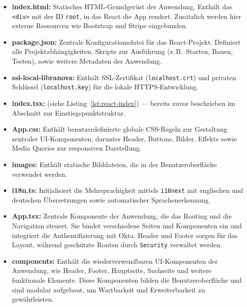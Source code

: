 \begin{itemize}
	\item \textbf{index.html:} Statisches HTML-Grundgerüst der Anwendung. Enthält das \texttt{<div>} mit der ID \texttt{root}, in das React die App rendert. Zusätzlich werden hier externe Ressourcen wie Bootstrap und Stripe eingebunden.
	
	\item \textbf{package.json:} Zentrale Konfigurationsdatei für das React-Projekt. Definiert alle Projektabhängigkeiten, Skripte zur Ausführung (z.\,B.\ Starten, Bauen, Testen), sowie weitere Metadaten der Anwendung.
	
	\item \textbf{ssl-local-libranova:} Enthält SSL-Zertifikat (\texttt{localhost.crt}) und privaten Schlüssel (\texttt{localhost.key}) für die lokale HTTPS-Entwicklung.
	
	\item \textbf{index.tsx:} (siehe Listing~\ref{lst:react-index}) — bereits zuvor beschrieben im Abschnitt zur Einstiegspunktstruktur.
	
	\item \textbf{App.css:} Enthält benutzerdefinierte globale CSS-Regeln zur Gestaltung zentraler UI-Komponenten, darunter Header, Buttons, Bilder, Effekte sowie Media Queries zur responsiven Darstellung.
	
	\item \textbf{images:} Enthält statische Bilddateien, die in der Benutzeroberfläche verwendet werden.
	
	\item \textbf{i18n.ts:} Initialisiert die Mehrsprachigkeit mittels \texttt{i18next} mit englischen und deutschen Übersetzungen sowie automatischer Sprachenerkennung.
	
	\item \textbf{App.tsx:}  
	Zentrale Komponente der Anwendung, die das Routing und die Navigation steuert.  
	Sie bindet verschiedene Seiten und Komponenten ein und integriert die Authentifizierung mit Okta.  
	Header und Footer sorgen für das Layout, während geschützte Routen durch \texttt{Security} verwaltet werden.
	
	\item \textbf{components:}  
	Enthält die wiederverwendbaren UI-Komponenten der Anwendung, wie Header, Footer, Hauptseite, Suchseite und weitere funktionale Elemente.  
	Diese Komponenten bilden die Benutzeroberfläche und sind modular aufgebaut, um Wartbarkeit und Erweiterbarkeit zu gewährleisten.
	

\end{itemize}
